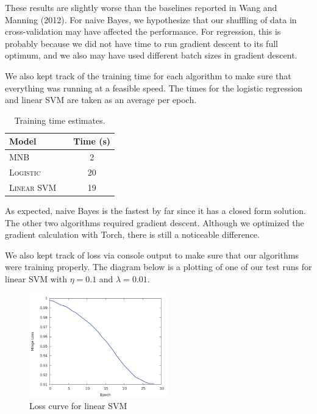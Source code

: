 \documentclass[11pt]{article}
\begin{document}
These results are slightly worse than the baselines reported in Wang and Manning (2012). For naive Bayes, we hypothesize that our shuffling of data in cross-validation may have affected the performance. For regression, this is probably because we did not have time to run gradient descent to its full optimum, and we also may have used different batch sizes in gradient descent.


We also kept track of the training time for each algorithm to make sure that everything was running at a feasible speed. The times for the logistic regression and linear SVM are taken as an average per epoch. 

\begin{table}[h]
  \centering
  \begin{tabular}{llc}
    \toprule
    Model & & Time (s) \\
    \midrule
    \textsc{MNB} & & 2 \\
    \textsc{Logistic} & & 20 \\
    \textsc{Linear SVM} & & 19 \\
  \end{tabular}
  \caption{\label{tab:timing} Training time estimates.}
\end{table}

As expected, naive Bayes is the fastest by far since it has a closed form solution. The other two algorithms required gradient descent. Although we optimized the gradient calculation with Torch, there is still a noticeable difference. 

We also kept track of loss via console output to make sure that our algorithms were training properly. The diagram below is a plotting of one of our test runs for linear SVM with $\eta = 0.1$ and $\lambda = 0.01$. 

\begin{figure}
  \centering
  \includegraphics[width=6cm]{hinge}
  \caption{\label{fig:loss} Loss curve for linear SVM}
\end{figure}
\end{document}
